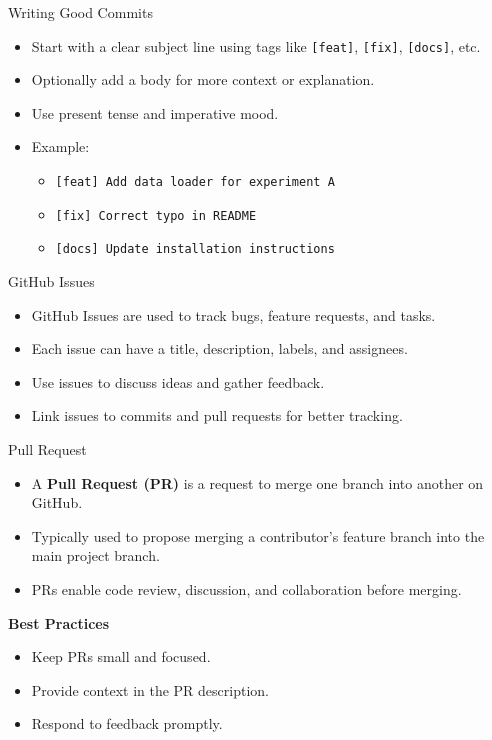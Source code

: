 \documentclass[12pt]{beamer}
\begin{document}
\begin{frame}{Writing Good Commits}
  \begin{itemize}
    \setlength\itemsep{1em}
    \item Start with a clear subject line using tags like \texttt{[feat]}, \texttt{[fix]}, \texttt{[docs]}, etc.
    \item Optionally add a body for more context or explanation.
    \item Use present tense and imperative mood.
    \item Example:
    \begin{itemize}
      \setlength\itemsep{1em}
      \item \texttt{[feat] Add data loader for experiment A}
      \item \texttt{[fix] Correct typo in README}
      \item \texttt{[docs] Update installation instructions}
    \end{itemize}
  \end{itemize}
\end{frame}

\begin{frame}{GitHub Issues}
  \begin{itemize}
    \setlength\itemsep{1em}
    \item GitHub Issues are used to track bugs, feature requests, and tasks.
    \item Each issue can have a title, description, labels, and assignees.
    \item Use issues to discuss ideas and gather feedback.
    \item Link issues to commits and pull requests for better tracking.
  \end{itemize}
\end{frame}

\begin{frame}{Pull Request}
  \begin{itemize}
    \item A \textbf{Pull Request (PR)} is a request to merge one branch into another on GitHub.
    \item Typically used to propose merging a contributor’s feature branch into the main project branch.
    \item PRs enable code review, discussion, and collaboration before merging.
  \end{itemize}

  \vspace{1em}
  \textbf{Best Practices}
  \vspace{1em}
  
  \begin{itemize}
    \item Keep PRs small and focused.
    \item Provide context in the PR description.
    \item Respond to feedback promptly.
  \end{itemize}
\end{frame}
\end{document}

